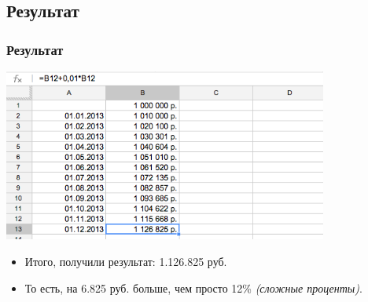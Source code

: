 \documentclass[compress,red]{beamer}
\begin{document}
\subsection{Результат}
\begin{frame}[fragile]
  \frametitle{Результат}
  \centerline{\includegraphics[width=0.8\textwidth]{images/17.png}}
  \begin{itemize}
    \item Итого, получили результат: 1.126.825 руб.
    \item То есть, на 6.825 руб. больше, чем просто 12\% \emph{(сложные проценты)}.
  \end{itemize}
\end{frame}
\end{document}
